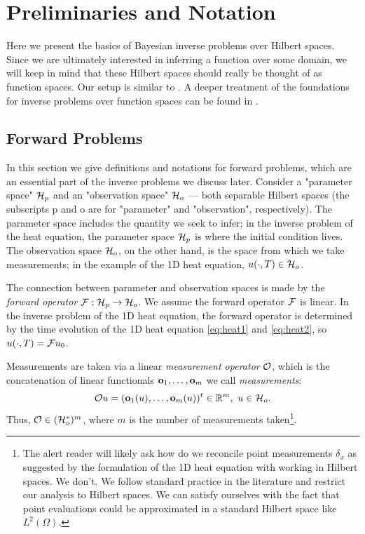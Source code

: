 \section{Preliminaries and Notation}\label{section:prelim}
Here we present the basics of Bayesian inverse problems over Hilbert
spaces. Since we are ultimately interested in inferring a function
over some domain, we will keep in mind that these Hilbert spaces
should really be thought of as function spaces. Our setup is similar
to \cite{knapik2011}. A deeper treatment of the foundations for
inverse problems over function spaces can be found in \cite{Stuart10}.


\subsection{Forward Problems}\label{subsec:abstract_OED}
In this section we give definitions and notations for forward problems,
which are an essential part of the inverse problems we discuss
later. Consider a "parameter space" \(\mathcal{H}_p\) and an "observation
space" \(\mathcal{H}_o\) --- both separable Hilbert spaces (the subscripts p
and o are for "parameter" and "observation", respectively). The
parameter space includes the quantity we seek to infer; in the inverse
problem of the heat equation, the parameter space $\mathcal{H}_p$ is where the
initial condition lives. The observation space $\mathcal{H}_o$, on the other
hand, is the space from which we take measurements; in the example of
the 1D heat equation, $u(\cdot, T) \in \mathcal{H}_o$.

The connection between parameter and observation spaces is made by the
\emph{forward operator} \(\mathcal{F}: \mathcal{H}_p \to \mathcal{H}_o\). We assume the
forward operator \(\mathcal{F}\) is linear. In the inverse problem of the 1D
heat equation, the forward operator is determined by the time
evolution of the 1D heat equation \eqref{eq:heat1} and
\eqref{eq:heat2}, so $u(\cdot, T) = \mathcal{F} u_0$.

Measurements are taken via a linear \emph{measurement operator}
\(\mathcal{O}\), which is the concatenation of linear functionals
$\mathbf{o}_1,\dots,\mathbf{o}_m$ we call \emph{measurements}:
\begin{equation*}%
  \obs u = (\meas_1(u), \dots, \meas_m(u) )^t \in \R^m,\ u \in \hilo.
\end{equation*}
Thus, \(\mathcal{O} \in ( \mathcal{H}_o^* )^m\), where \(m\) is the number of
measurements taken\footnote{The alert reader will likely ask how do we
reconcile point measurements $\delta_x$ as suggested by the
formulation of the 1D heat equation with working in Hilbert spaces. We
don't. We follow standard practice in the literature and restrict our
analysis to Hilbert spaces. We can satisfy ourselves with the fact
that point evaluations could be approximated in a standard Hilbert
space like $L^2(\Omega)$.}. %

